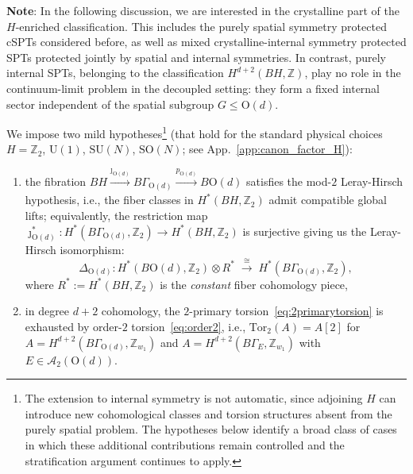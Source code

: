 \documentclass[aps,prx,reprint,superscriptaddress,twocolumn,amsmath,amssymb,amsfonts, nofootinbib]{revtex4-2}
\newcommand{\U}{\text{U}}
\newcommand{\SO}{\text{SO}}
\newcommand{\tor}{\text{Tor}}
\newcommand{\Z}{\mathbb{Z}}
\theoremstyle{apsstyle}
\begin{document}
{\bigskip 

\noindent \textbf{Note}: In the following discussion, we are interested in the crystalline part of the $H$-enriched classification. This includes the purely spatial symmetry protected cSPTs considered before, as well as mixed crystalline-internal symmetry protected SPTs protected jointly by spatial and internal symmetries. In contrast, purely internal SPTs, belonging to the classification $H^{d+2}(BH, \Z)$, play no role in the continuum-limit problem in the decoupled setting: they form a fixed internal sector independent of the spatial subgroup $G\le \mathrm{O}(d)$.

\bigskip

We impose two mild hypotheses\footnote{The extension to internal symmetry is not automatic, since adjoining $H$ can introduce new cohomological classes and torsion structures absent from the purely spatial problem. The hypotheses below identify a broad class of cases in which these additional contributions remain controlled and the stratification argument continues to apply.} (that hold for the standard physical choices $H=\Z_2$, $\U(1)$, $\mathrm{SU}(N)$, $\SO(N)$; see App.~\ref{app:canon_factor_H}): 
\begin{enumerate}[label=(H\arabic*),leftmargin=2.2em]
\item the fibration $BH\xrightarrow[]{\jmath_{\mathrm{O}(d)}} B\Gamma_{\mathrm{O}(d)}\xrightarrow[]{p_{\mathrm{O}(d)}} B\mathrm{O}(d)$ satisfies the mod-$2$ Leray-Hirsch hypothesis, i.e., the fiber classes in $H^{*}(BH,\mathbb Z_{2})$ admit compatible global lifts; equivalently, the restriction map $\jmath_{\mathrm{O}(d)}^{*}:H^{*}(B\Gamma_{\mathrm{O}(d)},\mathbb Z_{2})\to H^{*}(BH,\mathbb Z_{2})$ is surjective giving us the Leray-Hirsch isomorphism:
\begin{equation*}
    \Delta_{\mathrm{O}(d)}: H^{*}(B\mathrm{O}(d),\mathbb Z_{2})\otimes R^{*} \;\xrightarrow{\;\cong\;}\; H^{*}(B\Gamma_{\mathrm{O}(d)},\mathbb Z_{2}),
\end{equation*}
where $R^{*}:=H^{*}(BH,\mathbb Z_{2})$ is the \textit{constant} fiber cohomology piece,
\item in degree $d+2$ cohomology, the $2$-primary torsion~\eqref{eq:2primarytorsion} is exhausted by order-$2$ torsion~\eqref{eq:order2}, i.e., $\tor_2(A)=A[2]$ for $A=H^{d+2}(B\Gamma_{\mathrm{O}(d)}, \Z_{w_1})$ and $A=H^{d+2}(B\Gamma_E,\Z_{w_1})$ with $E\in \mathcal{A}_{2}(\mathrm{O}(d))$. 
\end{enumerate}

\bigskip


}
\end{document}
